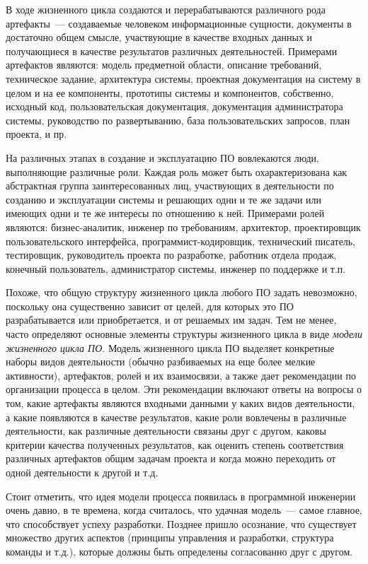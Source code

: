 \documentclass{../../text-style}
\begin{document}
В ходе жизненного цикла создаются и перерабатываются различного рода артефакты~--- создаваемые человеком информационные сущности, документы в достаточно общем смысле, участвующие в качестве входных данных и получающиеся в качестве результатов различных деятельностей.
Примерами артефактов являются: модель предметной области, описание требований, техническое задание, архитектура системы, проектная документация на систему в целом и на ее компоненты, прототипы системы и компонентов, собственно, исходный код, пользовательская документация, документация администратора системы, руководство по развертыванию, база пользовательских запросов, план проекта, и пр.

На различных этапах в создание и эксплуатацию ПО вовлекаются люди, выполняющие различные роли.
Каждая роль может быть охарактеризована как абстрактная группа заинтересованных лиц, участвующих в деятельности по созданию и эксплуатации системы и решающих одни и те же задачи или имеющих одни и те же интересы по отношению к ней.
Примерами ролей являются: бизнес-аналитик, инженер по требованиям, архитектор, проектировщик пользовательского интерфейса, программист-кодировщик, технический писатель, тестировщик, руководитель проекта по разработке, работник отдела продаж, конечный пользователь, администратор системы, инженер по поддержке и т.п.

Похоже, что общую структуру жизненного цикла любого ПО задать невозможно, поскольку она существенно зависит от целей, для которых это ПО разрабатывается или приобретается, и от решаемых им задач.
Тем не менее, часто определяют основные элементы структуры жизненного цикла в виде \emph{модели жизненного цикла ПО}.
Модель жизненного цикла ПО выделяет конкретные наборы видов деятельности (обычно разбиваемых на еще более мелкие активности), артефактов, ролей и их взаимосвязи, а также дает рекомендации по организации процесса в целом.
Эти рекомендации включают ответы на вопросы о том, какие артефакты являются входными данными у каких видов деятельности, а какие появляются в качестве результатов, какие роли вовлечены в различные деятельности, как различные деятельности связаны друг с другом, каковы критерии качества полученных результатов, как оценить степень соответствия различных артефактов общим задачам проекта и когда можно переходить от одной деятельности к другой и т.д.

Стоит отметить, что идея модели процесса появилась в программной инженерии очень давно, в те времена, когда считалось, что удачная модель~--- самое главное, что способствует успеху разработки.
Позднее пришло осознание, что существует множество других аспектов (принципы управления и разработки, структура команды и т.д.), которые должны быть определены согласованно друг с другом.
\end{document}
